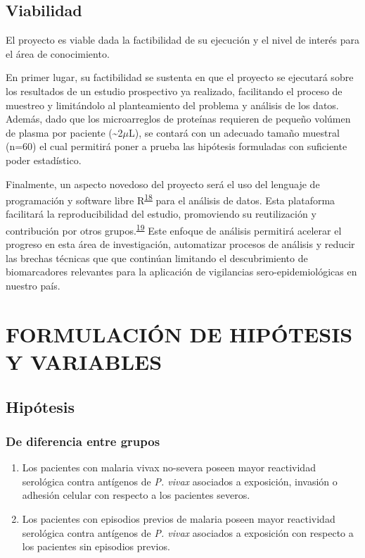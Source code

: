 \documentclass[]{article}
\begin{document}
\subsection{Viabilidad}\label{viabilidad}

El proyecto es viable dada la factibilidad de su ejecución y el nivel de
interés para el área de conocimiento.

En primer lugar, su factibilidad se sustenta en que el proyecto se
ejecutará sobre los resultados de un estudio prospectivo ya realizado,
facilitando el proceso de muestreo y limitándolo al planteamiento del
problema y análisis de los datos. Además, dado que los microarreglos de
proteínas requieren de pequeño volúmen de plasma por paciente
(\textasciitilde{}2\(\mu\)L), se contará con un adecuado tamaño muestral
(n=60) el cual permitirá poner a prueba las hipótesis formuladas con
suficiente poder estadístico.

Finalmente, un aspecto novedoso del proyecto será el uso del lenguaje de
programación y software libre
R\textsuperscript{\protect\hyperlink{ref-R}{18}} para el análisis de
datos. Esta plataforma facilitará la reproducibilidad del estudio,
promoviendo su reutilización y contribución por otros
grupos.\textsuperscript{\protect\hyperlink{ref-CienciaReproducible2016}{19}}
Este enfoque de análisis permitirá acelerar el progreso en esta área de
investigación, automatizar procesos de análisis y reducir las brechas
técnicas que que continúan limitando el descubrimiento de biomarcadores
relevantes para la aplicación de vigilancias sero-epidemiológicas en
nuestro país.

\section{FORMULACIÓN DE HIPÓTESIS Y
VARIABLES}\label{formulacion-de-hipotesis-y-variables}

\subsection{Hipótesis}\label{hipotesis}

\subsubsection{De diferencia entre
grupos}\label{de-diferencia-entre-grupos}

\begin{enumerate}
\def\labelenumi{\arabic{enumi}.}
\item
  Los pacientes con malaria vivax no-severa poseen mayor reactividad
  serológica contra antígenos de \emph{P. vivax} asociados a exposición,
  invasión o adhesión celular con respecto a los pacientes severos.
\item
  Los pacientes con episodios previos de malaria poseen mayor
  reactividad serológica contra antígenos de \emph{P. vivax} asociados a
  exposición con respecto a los pacientes sin episodios previos.
\end{enumerate}
\end{document}
